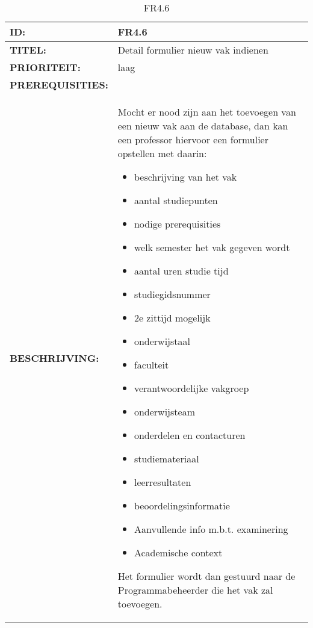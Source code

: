 \noindent\begin{table}[h]
            \begin{tabular}{l | p{10cm}} 
                \textbf{ID:} & FR4.6 \\ \hline
                \textbf{TITEL:} & Detail formulier nieuw vak indienen\\ \hline
                \textbf{PRIORITEIT:} &  laag \\ \hline
                \textbf{PREREQUISITIES:} & \\ \hline
                \textbf{BESCHRIJVING:} & Mocht er nood zijn aan het toevoegen van een nieuw vak aan de database, dan kan een professor hiervoor een formulier opstellen met daarin:
        \begin{itemize}\itemsep1pt \parskip0pt \parsep0pt
                                        \item beschrijving van het vak
                                        \item aantal studiepunten
                                        \item nodige prerequisities
                                        \item welk semester het vak gegeven wordt
                                        \item aantal uren studie tijd
                                        \item studiegidsnummer
                                        \item 2e zittijd mogelijk
                                        \item onderwijstaal
                                        \item faculteit
                                        \item verantwoordelijke vakgroep
                                        \item onderwijsteam
                                        \item onderdelen en contacturen
                                        \item studiemateriaal
                                        \item leerresultaten
                                        \item beoordelingsinformatie
                                        \item Aanvullende info m.b.t. examinering
                                        \item Academische context
                                        \end{itemize}
                                        Het formulier wordt dan gestuurd naar de Programmabeheerder die het vak zal toevoegen. 
            \end{tabular}\\
            \caption{FR4.6}
            \label{tab:myfourteenthtable}
        \end{table}
        
